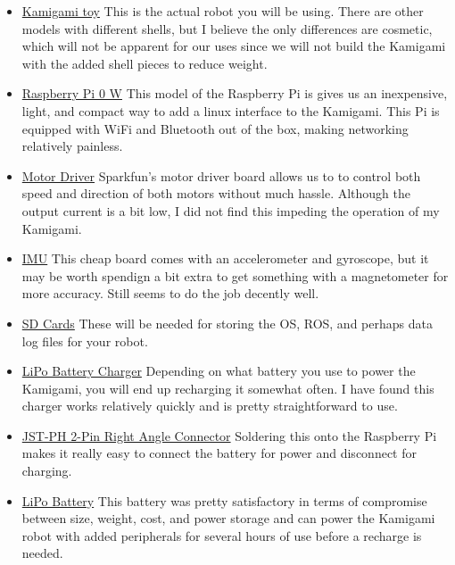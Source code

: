 \documentclass[11pt]{article}
\begin{document}
\begin{itemize}
    \item \href{https://www.amzn.com/gp/product/B06ZYVMZC5/}{Kamigami toy}
    This is the actual robot you will be using. There are other models with different shells, but I believe the only differences are cosmetic, which will not be apparent for our uses since we will not build the Kamigami with the added shell pieces to reduce weight.
    
    \item \href{https://www.adafruit.com/product/3400}{Raspberry Pi 0 W}
    This model of the Raspberry Pi is gives us an inexpensive, light, and compact way to add a linux interface to the Kamigami. This Pi is equipped with WiFi and Bluetooth out of the box, making networking relatively painless.
    
    \item \href{https://www.sparkfun.com/products/14451}{Motor Driver}
    Sparkfun's motor driver board allows us to to control both speed and direction of both motors without much hassle. Although the output current is a bit low, I did not find this impeding the operation of my Kamigami.
    
    \item \href{https://www.adafruit.com/product/4480}{IMU} This cheap board comes with an accelerometer and gyroscope, but it may be worth spendign a bit extra to get something with a magnetometer for more accuracy. Still seems to do the job decently well.
    
    \item \href{https://www.amzn.com//dp/B07TDN2G18/}{SD Cards} These will be needed for storing the OS, ROS, and perhaps data log files for your robot.
    
    \item \href{https://www.adafruit.com/product/259}{LiPo Battery Charger} Depending on what battery you use to power the Kamigami, you will end up recharging it somewhat often. I have found this charger works relatively quickly and is pretty straightforward to use.
    
    \item \href{https://www.adafruit.com/product/1862}{JST-PH 2-Pin Right Angle Connector} Soldering this onto the Raspberry Pi makes it really easy to connect the battery for power and disconnect for charging.
    
    \item \href{https://www.adafruit.com/product/1862}{LiPo Battery} This battery was pretty satisfactory in terms of compromise between size, weight, cost, and power storage and can power the Kamigami robot with added peripherals for several hours of use before a recharge is needed.
    
\end{itemize}
\end{document}
